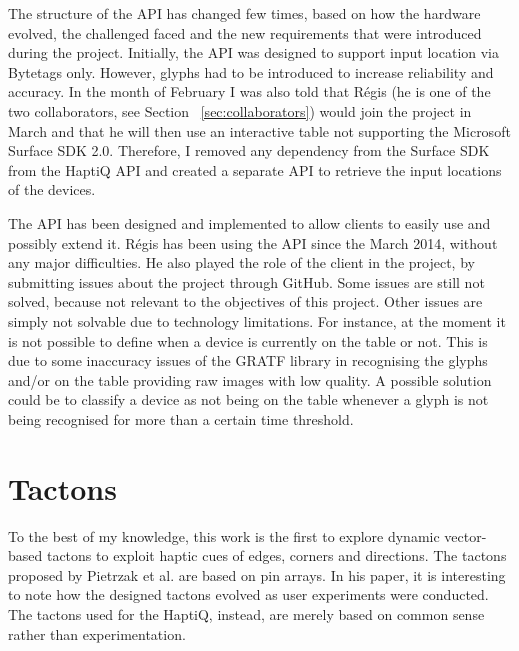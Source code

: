The structure of the API has changed few times, based on how the hardware evolved, the challenged faced and the new requirements that were introduced during the project. 
Initially, the API was designed to support input location via Bytetags only. However, glyphs had to be introduced to increase reliability and accuracy. In the month of February I was also told that Régis (he is one of the two collaborators, see Section ~\ref{sec:collaborators}) would join the project in March and that he will then use an interactive table not supporting the Microsoft Surface SDK 2.0. Therefore, I removed any dependency from the Surface SDK from the HaptiQ API and created a separate API to retrieve the input locations of the devices. 

The API has been designed and implemented to allow clients to easily use and possibly extend it. Régis has been using the API since the  March 2014, without any major difficulties. He also played the role of the client in the project, by submitting issues about the project through GitHub. Some issues are still not solved, because not relevant to the objectives of this project. Other issues are simply not solvable due to technology limitations. For instance, at the moment it is not possible to define when a device is currently on the table or not. This is due to some inaccuracy issues of the GRATF library in recognising the glyphs and/or on the table providing raw images with low quality. A possible solution could be to classify a device as not being on the table whenever a glyph is not being recognised for more than a certain time threshold. 


\section{Tactons}

To the best of my knowledge, this work is the first to explore dynamic vector-based tactons to exploit haptic cues of edges, corners and directions. The tactons proposed by Pietrzak et al. \cite{pietrzak2009creating} are based on pin arrays. In his paper, it is interesting to note how the designed tactons evolved as user experiments were conducted. The tactons used for the HaptiQ, instead, are merely based on common sense rather than experimentation. 

